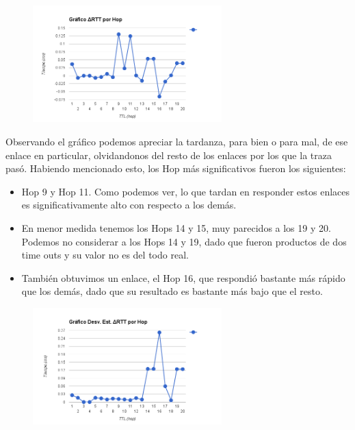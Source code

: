 \begin{figure}[h]
    \includegraphics[width=0.65\textwidth]{img_analisis1/delta_rtt_hop.png}
    
\end{figure}
\vspace{0.25cm}
Observando el gr\'afico podemos apreciar la tardanza, para bien o para mal, de ese enlace en particular, olvidandonos del resto de los enlaces por los que la traza pas\'o. Habiendo mencionado esto, los Hop m\'as significativos fueron los siguientes:
\begin{itemize}
\item Hop 9 y Hop 11. Como podemos ver, lo que tardan en responder estos enlaces es significativamente alto con respecto a los dem\'as.
\item En menor medida tenemos los Hops 14 y 15, muy parecidos a los 19 y 20. Podemos no considerar a los Hops 14 y 19, dado que fueron productos de dos time outs y su valor no es del todo real.
\item Tambi\'en obtuvimos un enlace, el Hop 16, que respondi\'o bastante m\'as r\'apido que los dem\'as, dado que su resultado es bastante m\'as bajo que el resto.
\end{itemize}

\begin{figure}[h]
    \includegraphics[width=0.65\textwidth]{img_analisis1/ds_delta_rtt_hop.png}
    
\end{figure}
\vspace{0.25cm}

